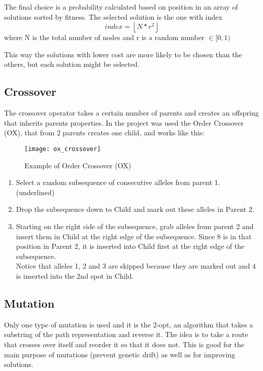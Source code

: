 		The final choice is a probability calculated based on position in an array of solutions sorted by fitness. The selected solution is the one with index
		\[index = \left \lfloor{N * r^{2}}\right \rfloor\]
		where N is the total number of nodes and r is a random number $\in [0, 1)$
		
		This way the solutions with lower cost are more likely to be chosen than the others, but each solution might be selected.
		
	\subsection{Crossover}
		The crossover operator takes a certain number of parents and creates an offspring that inherits parents properties. In the project was used the Order Crossover (OX), that from 2 parents creates one child, and works like this:
		
		\begin{figure}[h]
		\texttt{[image: ox\_crossover]}
		\centering
		\caption{Example of Order Crossover (OX)}
		\end{figure}
		
		\begin{enumerate}
			\item Select a random subsequence of consecutive alleles from parent 1. (underlined)
			\item Drop the subsequence down to Child and mark out these alleles in Parent 2.
			\item Starting on the right side of the subsequence, grab alleles from parent 2 and insert them in Child at the right edge of the subsequence. Since 8 is in that position in Parent 2, it is inserted into Child first at the right edge of the subsequence.\\
				Notice that alleles 1, 2 and 3 are skipped because they are marked out and 4 is inserted into the 2nd spot in Child.
		\end{enumerate}
		
	\subsection{Mutation}
		Only one type of mutation is used and it is the 2-opt, an algorithm that takes a substring of the path representation and reverse it. The idea is to take a route that crosses over itself and reorder it so that it does not.
		This is good for the main purpose of mutations (prevent genetic drift) as well as for improving solutions.
		
